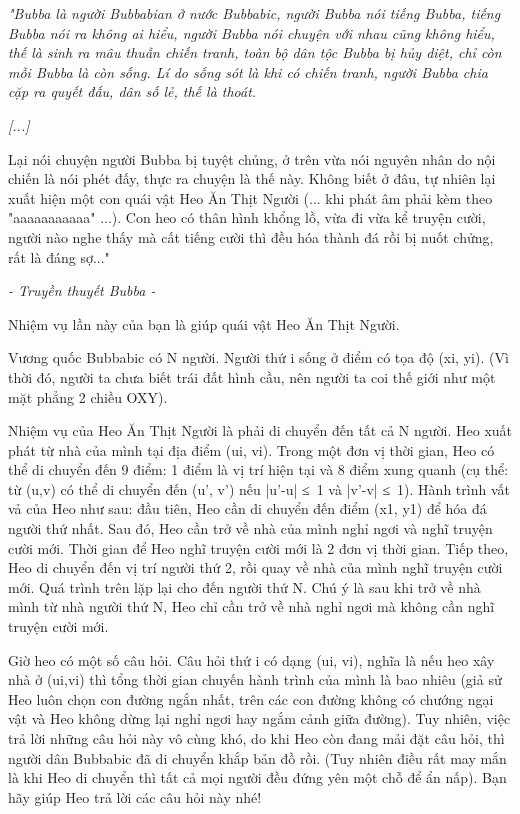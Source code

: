 



\emph{    "Bubba là người Bubbabian ở nước Bubbabic, người Bubba nói tiếng Bubba, tiếng Bubba nói ra không ai hiểu, người Bubba nói chuyện với nhau cũng không hiểu, thế là sinh ra mâu thuẫn chiến tranh, toàn bộ dân tộc Bubba bị hủy diệt, chỉ còn mỗi Bubba là còn sống. Lí do sống sót là khi có chiến tranh, người Bubba chia cặp ra quyết đấu, dân số lẻ, thế là thoát.   }

\emph{    [...]   }

    Lại nói chuyện người Bubba bị tuyệt chủng, ở trên vừa nói nguyên nhân do nội chiến là nói phét đấy, thực ra chuyện là thế này. Không biết ở đâu, tự nhiên lại xuất hiện một con quái vật Heo Ăn Thịt Người (... khi phát âm phải kèm theo "aaaaaaaaaaa" ...). Con heo có thân hình khổng lồ, vừa đi vừa kể truyện cười, người nào nghe thấy mà cất tiếng cười thì đều hóa thành đá rồi bị nuốt chửng, rất là đáng sợ..."   

\emph{    - Truyền thuyết Bubba -   }

   Nhiệm vụ lần này của bạn là giúp quái vật Heo Ăn Thịt Người.  

   Vương quốc Bubbabic có N người. Người thứ i sống ở điểm có tọa độ (xi, yi). (Vì thời đó, người ta chưa biết trái đất hình cầu, nên người ta coi thế giới như một mặt phẳng 2 chiều OXY).  

   Nhiệm vụ của Heo Ăn Thịt Người là phải di chuyển đến tất cả N người. Heo xuất phát từ nhà của mình tại địa điểm (ui, vi). Trong một đơn vị thời gian, Heo có thể di chuyển đến 9 điểm: 1 điểm là vị trí hiện tại và 8 điểm xung quanh (cụ thể: từ (u,v) có thể di chuyển đến (u', v') nếu |u'-u| ≤ 1 và |v'-v| ≤ 1). Hành trình vất vả của Heo như sau: đầu tiên, Heo cần di chuyển đến điểm (x1, y1) để hóa đá người thứ nhất. Sau đó, Heo cần trở về nhà của mình nghỉ ngơi và nghĩ truyện cười mới. Thời gian để Heo nghĩ truyện cười mới là 2 đơn vị thời gian. Tiếp theo, Heo di chuyển đến vị trí người thứ 2, rồi quay về nhà của mình nghĩ truyện cười mới. Quá trình trên lặp lại cho đến người thứ N. Chú ý là sau khi trở về nhà mình từ nhà người thứ N, Heo chỉ cần trở về nhà nghỉ ngơi mà không cần nghĩ truyện cười mới.  

   Giờ heo có một số câu hỏi. Câu hỏi thứ i có dạng (ui, vi), nghĩa là nếu heo xây nhà ở (ui,vi) thì tổng thời gian chuyến hành trình của mình là bao nhiêu (giả sử Heo luôn chọn con đường ngắn nhất, trên các con đường không có chướng ngại vật và Heo không dừng lại nghỉ ngơi hay ngắm cảnh giữa đường). Tuy nhiên, việc trả lời những câu hỏi này vô cùng khó, do khi Heo còn đang mải đặt câu hỏi, thì người dân Bubbabic đã di chuyển khắp bản đồ rồi. (Tuy nhiên điều rất may mắn là khi Heo di chuyển thì tất cả mọi người đều đứng yên một chỗ để ẩn nấp). Bạn hãy giúp Heo trả lời các câu hỏi này nhé!  


